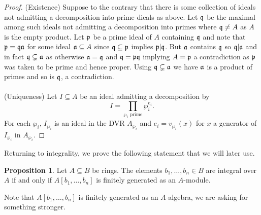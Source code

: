 \documentclass{amsart}
\theoremstyle{definition}
\newtheorem{proposition}[theorem]{Proposition}
\numberwithin{equation}{section}
\begin{document}
\begin{proof}
  (Existence) Suppose to the contrary that there is some collection of ideals not admitting a decomposition into prime dieals as above. Let $\mathfrak{q}$ be the maximal among such ideals not admitting a decomposition into primes where $\mathfrak{q}\neq A$ as $A$ is the empty product. Let $\mathfrak{p}$ be a prime ideal of $A$ containing $\mathfrak{q}$ and note that $\mathfrak{p}=\mathfrak{q}\mathfrak{a}$ for some ideal $\mathfrak{a}\subseteq A$ since $\mathfrak{q}\subseteq\mathfrak{p}$ implies $\mathfrak{p}|\mathfrak{q}$. But $\mathfrak{a}$ contains $\mathfrak{q}$ so $\mathfrak{q}|\mathfrak{a}$ and in fact $\mathfrak{q}\subsetneq\mathfrak{a}$ as otherwise $\mathfrak{a}=\mathfrak{q}$ and $\mathfrak{q}=\mathfrak{p}\mathfrak{q}$ implying $A=\mathfrak{p}$ a contradiction as $\mathfrak{p}$ was taken to be prime and hence proper. Using $\mathfrak{q}\subsetneq\mathfrak{a}$ we have $\mathfrak{a}$ is a product of primes and so is $\mathfrak{q}$, a contradiction. 
  \\\\
  (Uniqueness) Let $I\subseteq A$ be an ideal admitting a decomposition by 
  $$I=\prod_{\wp_{i}\text{ prime}}\wp_{i}^{e_{i}}.$$
  For each $\wp_{i}$, $I_{\wp_{i}}$ is an ideal in the DVR $A_{\wp_{i}}$ and $e_{i}=v_{\wp_{i}}(x)$ for $x$ a generator of $I_{\wp_{i}}$ in $A_{\wp_{i}}$.
\end{proof}
Returning to integrality, we prove the following statement that we will later use. 
\begin{proposition}\label{prop:integral over iff finite generation as a module}
  Let $A\subseteq B$ be rings. The elements $b_{1},\dots,b_{n}\in B$ are integral over $A$ if and only if $A[b_{1},\dots,b_{n}]$ is finitely generated as an $A$-module. 
\end{proposition}
Note that $A[b_{1},\dots,b_{n}]$ is finitely generated as an $A$-algebra, we are asking for something stronger. 
\end{document}

